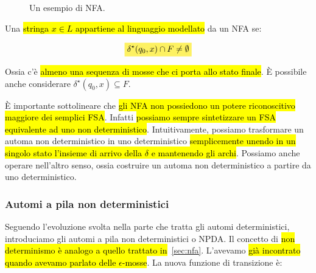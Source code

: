 \documentclass[a4paper,11pt,twoside]{article}
\theoremstyle{plain}
\theoremstyle{definition}
\theoremstyle{remark}
\newcommand{\mhl}[1]{\colorbox{hlcolor}{$\displaystyle #1$}}
\begin{document}
\begin{figure}[htb]
  \centering
  \caption{Un esempio di NFA.}\label{fig:nfa}
\end{figure}

Una \hl{stringa $x \in L$ appartiene al linguaggio modellato} da un NFA se:

\begin{equation}
  \mhl{ \delta^\star(q_0, x) \cap F \neq \emptyset }
\end{equation}

Ossia c'è \hl{almeno una sequenza di mosse che ci porta allo stato finale}. È
possibile anche considerare $\delta^\star(q_0, x) \subseteq F$.

È importante sottolineare che \hl{gli NFA non possiedono un potere riconoscitivo
maggiore dei semplici FSA}\@. Infatti \hl{possiamo sempre sintetizzare un FSA
equivalente ad uno non deterministico}. Intuitivamente, possiamo trasformare un
automa non deterministico in uno deterministico \hl{semplicemente unendo in un
singolo stato l'insieme di arrivo della $\delta$ e mantenendo gli archi}.
Possiamo anche operare nell'altro senso, ossia costruire un automa non
deterministico a partire da uno deterministico.

\subsubsection{Automi a pila non deterministici}\label{sec:npda}

Seguendo l'evoluzione svolta nella parte che tratta gli automi deterministici,
introduciamo gli automi a pila non deterministici o NPDA\@. Il concetto di \hl{non
determinismo è analogo a quello trattato in}~\ref{sec:nfa}. L'avevamo \hl{già
incontrato quando avevamo parlato delle $\epsilon$-mosse}. La nuova funzione di
transizione è:
\end{document}
